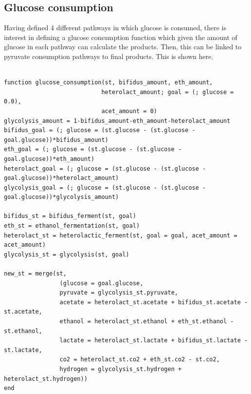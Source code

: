 \documentclass[11pt]{article}
\begin{document}
\subsection{Glucose consumption}
\label{sec:org2136e01}
Having defined 4 different pathways in which glucose is consumed, there is interest in defining a glucose consumption function which given the amount of glucose in each pathway can calculate the products. Then, this can be linked to pyruvate consumption pathways to final products. This is shown here.

\begin{verbatim}

function glucose_consumption(st, bifidus_amount, eth_amount,
                            heterolact_amount; goal = (; glucose = 0.0),
                            acet_amount = 0)
glycolysis_amount = 1-bifidus_amount-eth_amount-heterolact_amount
bifidus_goal = (; glucose = (st.glucose - (st.glucose - goal.glucose))*bifidus_amount)
eth_goal = (; glucose = (st.glucose - (st.glucose - goal.glucose))*eth_amount)
heterolact_goal = (; glucose = (st.glucose - (st.glucose - goal.glucose))*heterolact_amount)
glycolysis_goal = (; glucose = (st.glucose - (st.glucose - goal.glucose))*glycolysis_amount)

bifidus_st = bifidus_ferment(st, goal)
eth_st = ethanol_fermentation(st, goal)
heterolact_st = heterolactic_ferment(st, goal = goal, acet_amount = acet_amount)
glycolysis_st = glycolysis(st, goal)

new_st = merge(st,
                (glucose = goal.glucose,
                pyruvate = glycolysis_st.pyruvate,
                acetate = heterolact_st.acetate + bifidus_st.acetate - st.acetate,
                ethanol = heterolact_st.ethanol + eth_st.ethanol - st.ethanol,
                lactate = heterolact_st.lactate + bifidus_st.lactate - st.lactate,
                co2 = heterolact_st.co2 + eth_st.co2 - st.co2,
                hydrogen = glycolysis_st.hydrogen + heterolact_st.hydrogen))
end

\end{verbatim}
\end{document}
